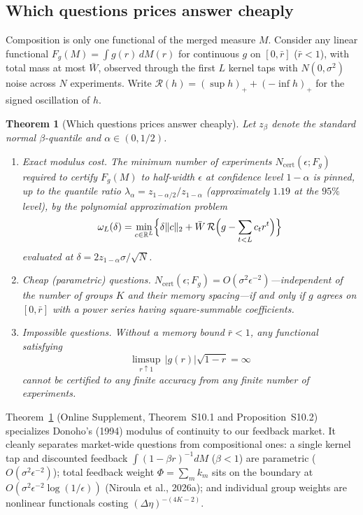 \documentclass[11pt,letterpaper]{article}
\newtheorem{theorem}{Theorem}[section]
\theoremstyle{definition}
\newcommand{\R}{\mathbb{R}}
\begin{document}
\subsection{Which questions prices answer cheaply}

Composition is only one functional of the merged measure $M$. Consider any linear functional $F_g(M) = \int g(r)\, dM(r)$ for continuous $g$ on $[0, \bar{r}]$ ($\bar{r} < 1$), with total mass at most $\bar{W}$, observed through the first $L$ kernel taps with $N(0, \sigma^2)$ noise across $N$ experiments. Write $\mathcal{R}(h) = (\sup h)_+ + (-\inf h)_+$ for the signed oscillation of $h$.

\begin{theorem}[Which questions prices answer cheaply]\label{thm:cheap}
Let $z_\beta$ denote the standard normal $\beta$-quantile and $\alpha \in (0, 1/2)$.
\begin{enumerate}
  \item[(i)] \emph{Exact modulus cost.} The minimum number of experiments $N_{\mathrm{cert}}(\epsilon; F_g)$ required to certify $F_g(M)$ to half-width $\epsilon$ at confidence level $1-\alpha$ is pinned, up to the quantile ratio $\lambda_\alpha = z_{1-\alpha/2}/z_{1-\alpha}$ (approximately $1.19$ at the $95\%$ level), by the polynomial approximation problem
  \[
    \omega_L(\delta) = \min_{c \in \R^L} \Bigl\{ \delta \|c\|_2 + \bar{W}\, \mathcal{R}\Bigl(g - \sum_{t < L} c_t r^t\Bigr) \Bigr\}
  \]
  evaluated at $\delta = 2 z_{1-\alpha} \sigma / \sqrt{N}$.
  \item[(ii)] \emph{Cheap (parametric) questions.} $N_{\mathrm{cert}}(\epsilon; F_g) = O(\sigma^2 \epsilon^{-2})$—independent of the number of groups $K$ and their memory spacing—if and only if $g$ agrees on $[0, \bar{r}]$ with a power series having square-summable coefficients.
  \item[(iii)] \emph{Impossible questions.} Without a memory bound $\bar{r} < 1$, any functional satisfying
  \[
    \limsup_{r \uparrow 1}\, |g(r)|\sqrt{1 - r} = \infty
  \]
  cannot be certified to any finite accuracy from any finite number of experiments.
\end{enumerate}
\end{theorem}

Theorem~\ref{thm:cheap} (Online Supplement, Theorem~S10.1 and Proposition~S10.2) specializes Donoho's (1994) modulus of continuity to our feedback market. It cleanly separates market-wide questions from compositional ones: a single kernel tap and discounted feedback $\int (1 - \beta r)^{-1} dM$ ($\beta < 1$) are parametric ($O(\sigma^2 \epsilon^{-2})$); total feedback weight $\Phi = \sum_m k_m$ sits on the boundary at $O(\sigma^2 \epsilon^{-2} \log(1/\epsilon))$ (Niroula et al., 2026a); and individual group weights are nonlinear functionals costing $(\Delta\eta)^{-(4K-2)}$.
\end{document}
